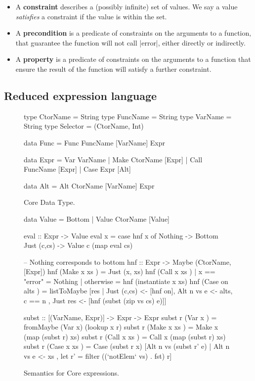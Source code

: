 \documentclass[preprint]{sigplanconf}
\begin{document}
\begin{itemize}
\item A \textbf{constraint} describes a (possibly infinite) set of values. We say a value \textit{satisfies} a constraint if the value is within the set.
\item A \textbf{precondition} is a predicate of constraints on the arguments to a function, that guarantee the function will not call |error|, either directly or indirectly.
\item A \textbf{property} is a predicate of constraints on the arguments to a function that ensure the result of the function will satisfy a further constraint.
\end{itemize}

\subsection{Reduced expression language}
\label{sec:core}

\begin{figure}
\begin{code}
type CtorName  =  String
type FuncName  =  String
type VarName   =  String
type Selector  =  (CtorName, Int)

data Func  =  Func FuncName [VarName] Expr

data Expr  =  Var   VarName
           |  Make  CtorName  [Expr]
           |  Call  FuncName  [Expr]
           |  Case  Expr      [Alt]

data Alt   =  Alt CtorName [VarName] Expr
\end{code}
\caption{Core Data Type.}
\label{fig:core}
\end{figure}

\begin{figure}
\begin{code}
data Value = Bottom | Value CtorName [Value]

eval :: Expr -> Value
eval x = case  hnf x of
               Nothing      -> Bottom
               Just (c,cs)  -> Value c (map eval cs)

-- Nothing corresponds to bottom
hnf :: Expr -> Maybe (CtorName, [Expr])
hnf (Make  x   xs    )  =  Just (x, xs)
hnf (Call  x   xs    )  |  x == "error"  = Nothing
                        |  otherwise     = hnf (instantiate x xs)
hnf (Case  on  alts  )  =  listToMaybe [res
       |  Just (c,cs) <- [hnf on], Alt n vs e <- alts, c == n
       ,  Just res <- [hnf (subst (zip vs cs) e)]]

subst :: [(VarName, Expr)] -> Expr -> Expr
subst r (Var   x     ) = fromMaybe (Var x) (lookup x r)
subst r (Make  x xs  ) = Make  x (map (subst r) xs)
subst r (Call  x xs  ) = Call  x (map (subst r) xs)
subst r (Case  x xs  ) = Case (subst r x)
    [Alt n vs (subst r' e) | Alt n vs e <- xs
    , let r' = filter ((`notElem` vs) . fst) r]
\end{code}
\caption{Semantics for Core expressions.}
\label{fig:semantics}
\end{figure}
\end{document}
